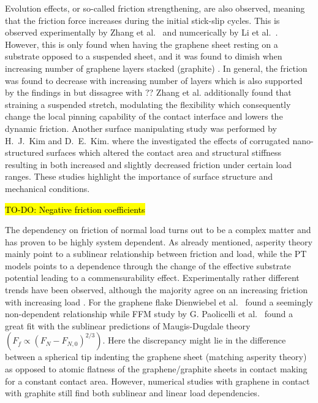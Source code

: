 Evolution effects, or so-called friction strengthening, are also observed, meaning that the friction force increases during the initial stick-slip cycles. This is observed experimentally by Zhang et al.\ \cite{zhang_tuning_2019} and numcerically by Li et al.\ \cite{li_evolving_2016}. However, this is only found when having the graphene sheet resting on a substrate
\cite{zhang_tuning_2019} opposed to a suspended sheet, and it was found to
dimish when increasing number of graphene layers stacked (graphite)
\cite{li_evolving_2016}. In general, the friction was found to decrease with
increasing number of layers which is also supported by the findings in
\cite{Yoon2015MolecularDS} but dissagree with \cite{Reguzzoni_2012}?? Zhang et
al. \cite{zhang_tuning_2019} additionally found that straining a suspended
stretch, modulating the flexibility which consequently change the local pinning
capability of the contact interface and lowers the dynamic friction. Another surface manipulating study was performed by H.\ J.\ Kim and D.\ E.\ Kim. \cite{Kim_2012} where the investigated the effects of corrugated
nano-structured surfaces which altered the contact area and structural stiffness resulting in both increased and slightly decreased friction under certain load ranges. These studies highlight the importance of surface structure and mechanical conditions. 


\hl{TO-DO: Negative friction coefficients} 


The dependency on friction of normal load turns out to be a complex matter and
has proven to be highly system dependent. As already mentioned, asperity theory
mainly point to a sublinear relationship between friction and load, while the
\acrshort{PT} models points to a dependence through the change of the effective
substrate potential leading to a commensurability effect. Experimentally rather
different trends have been observed, although the majority agree on an
increasing friction with increasing load \cite[p. 200]{gnecco_meyer_2015}. For
the graphene flake Dienwiebel et al.\ \cite{DIENWIEBEL2005197} found a seemingly
non-dependent relationship while \acrshort{FFM} study by G. Paolicelli et al.\
\cite{Paolicelli_2015} found a great fit with the sublinear predictions of
Maugis-Dugdale theory $(F_f \propto (F_N - F_{N,0})^{2/3})$. Here the
discrepancy might lie in the difference between a spherical tip indenting the
graphene sheet (matching asperity theory) as opposed to atomic flatness of the
graphene/graphite sheets in contact making for a constant contact area. However,
numerical studies with graphene in contact with graphite still find both
sublinear \cite{bonelli_atomistic_2009} and linear \cite{ma12091425} load
dependencies.

